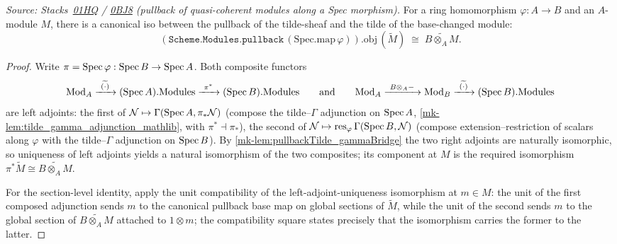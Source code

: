 \begin{lemma}
  \label{mk-lem:pullback_tildeIso}
  \leanok

  \textit{Source: Stacks~\href{https://stacks.math.columbia.edu/tag/01HQ}{01HQ}
  / \href{https://stacks.math.columbia.edu/tag/0BJ8}{0BJ8} (pullback of
  quasi-coherent modules along a Spec morphism).}
  For a ring homomorphism \(\varphi : A \to B\) and an \(A\)-module
  \(M\), there is a canonical iso between the pullback of the
  tilde-sheaf and the tilde of the base-changed module:
  \[
    (\mathtt{Scheme.Modules.pullback}\, (\mathrm{Spec.map}\, \varphi)).\mathrm{obj}\,
      (\widetilde{M})
    \;\cong\;
    \widetilde{B \otimes_A M}.
  \]
\end{lemma}
\begin{proof}
  \leanok
  Write \(\pi = \operatorname{Spec}\varphi : \operatorname{Spec} B \to \operatorname{Spec} A\). Both composite
  functors
  \[
    \mathrm{Mod}_{A} \xrightarrow{\ \widetilde{(\cdot)}\ }
      (\Spec A).\mathrm{Modules} \xrightarrow{\ \pi^{*}\ }
      (\Spec B).\mathrm{Modules}
    \qquad\text{and}\qquad
    \mathrm{Mod}_{A} \xrightarrow{\ B \otimes_A -\ } \mathrm{Mod}_{B}
      \xrightarrow{\ \widetilde{(\cdot)}\ } (\Spec B).\mathrm{Modules}
  \]
  are left adjoints: the first of
  \(\mathcal N \mapsto \Gamma(\operatorname{Spec} A, \pi_{*}\mathcal N)\) (compose the
  tilde--\(\Gamma\) adjunction on \(\operatorname{Spec} A\),
  \ref{mk-lem:tilde_gamma_adjunction_mathlib}, with
  \(\pi^{*} \dashv \pi_{*}\)), the second of
  \(\mathcal N \mapsto \mathrm{res}_{\varphi}\,\Gamma(\operatorname{Spec} B, \mathcal N)\)
  (compose extension--restriction of scalars along \(\varphi\) with the
  tilde--\(\Gamma\) adjunction on \(\operatorname{Spec} B\)). By
  \ref{mk-lem:pullbackTilde_gammaBridge} the two right adjoints are
  naturally isomorphic, so uniqueness of left adjoints yields a natural
  isomorphism of the two composites; its component at \(M\) is the
  required isomorphism
  \(\pi^{*}\widetilde M \cong \widetilde{B \otimes_A M}\).

  For the section-level identity, apply the unit compatibility of the
  left-adjoint-uniqueness isomorphism at \(m \in M\): the unit of the
  first composed adjunction sends \(m\) to the canonical pullback base map
  on global sections of \(\widetilde M\), while the unit
  of the second sends \(m\) to the global section of
  \(\widetilde{B \otimes_A M}\) attached to \(1 \otimes m\); the
  compatibility square states precisely that the isomorphism carries
  the former to the latter.
\end{proof}

